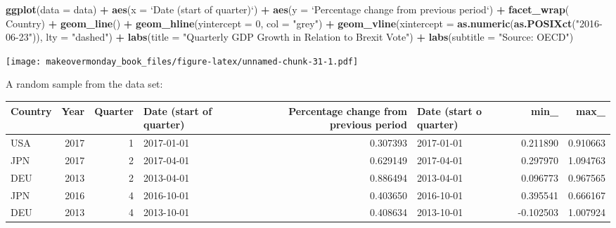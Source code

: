 \documentclass[]{book}
\newenvironment{Shaded}{\begin{snugshade}}{\end{snugshade}}
\newcommand{\KeywordTok}[1]{\textcolor[rgb]{0.13,0.29,0.53}{\textbf{#1}}}
\newcommand{\DataTypeTok}[1]{\textcolor[rgb]{0.13,0.29,0.53}{#1}}
\newcommand{\DecValTok}[1]{\textcolor[rgb]{0.00,0.00,0.81}{#1}}
\newcommand{\StringTok}[1]{\textcolor[rgb]{0.31,0.60,0.02}{#1}}
\newcommand{\OperatorTok}[1]{\textcolor[rgb]{0.81,0.36,0.00}{\textbf{#1}}}
\newcommand{\NormalTok}[1]{#1}
\theoremstyle{definition}
\theoremstyle{definition}
\theoremstyle{definition}
\theoremstyle{remark}
\begin{document}
\begin{Shaded}
\begin{Highlighting}[]
\KeywordTok{ggplot}\NormalTok{(}\DataTypeTok{data =}\NormalTok{ data) }\OperatorTok{+}
\StringTok{  }\KeywordTok{aes}\NormalTok{(}\DataTypeTok{x =} \StringTok{`}\DataTypeTok{Date (start of quarter)}\StringTok{`}\NormalTok{) }\OperatorTok{+}
\StringTok{  }\KeywordTok{aes}\NormalTok{(}\DataTypeTok{y =} \StringTok{`}\DataTypeTok{Percentage change from previous period}\StringTok{`}\NormalTok{) }\OperatorTok{+}
\StringTok{  }\KeywordTok{facet_wrap}\NormalTok{(}\OperatorTok{~}\StringTok{ }\NormalTok{Country) }\OperatorTok{+}
\StringTok{  }\KeywordTok{geom_line}\NormalTok{() }\OperatorTok{+}
\StringTok{  }\KeywordTok{geom_hline}\NormalTok{(}\DataTypeTok{yintercept =} \DecValTok{0}\NormalTok{, }\DataTypeTok{col =} \StringTok{"grey"}\NormalTok{) }\OperatorTok{+}
\StringTok{  }\KeywordTok{geom_vline}\NormalTok{(}\DataTypeTok{xintercept =} \KeywordTok{as.numeric}\NormalTok{(}\KeywordTok{as.POSIXct}\NormalTok{(}\StringTok{"2016-06-23"}\NormalTok{)), }\DataTypeTok{lty =} \StringTok{"dashed"}\NormalTok{) }\OperatorTok{+}
\StringTok{  }\KeywordTok{labs}\NormalTok{(}\DataTypeTok{title =} \StringTok{"Quarterly GDP Growth in Relation to Brexit Vote"}\NormalTok{) }\OperatorTok{+}
\StringTok{  }\KeywordTok{labs}\NormalTok{(}\DataTypeTok{subtitle =} \StringTok{"Source: OECD"}\NormalTok{)}
\end{Highlighting}
\end{Shaded}

\texttt{[image: makeovermonday\_book\_files/figure-latex/unnamed-chunk-31-1.pdf]}

A random sample from the data set:

\begin{tabular}{l|r|r|l|r|l|r|r}
\hline
Country & Year & Quarter & Date (start of quarter) & Percentage change from previous period & Date (start o quarter) & min\_ & max\_\\
\hline
USA & 2017 & 1 & 2017-01-01 & 0.307393 & 2017-01-01 & 0.211890 & 0.910663\\
\hline
JPN & 2017 & 2 & 2017-04-01 & 0.629149 & 2017-04-01 & 0.297970 & 1.094763\\
\hline
DEU & 2013 & 2 & 2013-04-01 & 0.886494 & 2013-04-01 & 0.096773 & 0.967565\\
\hline
JPN & 2016 & 4 & 2016-10-01 & 0.403650 & 2016-10-01 & 0.395541 & 0.666167\\
\hline
DEU & 2013 & 4 & 2013-10-01 & 0.408634 & 2013-10-01 & -0.102503 & 1.007924\\
\hline
\end{tabular}
\end{document}
